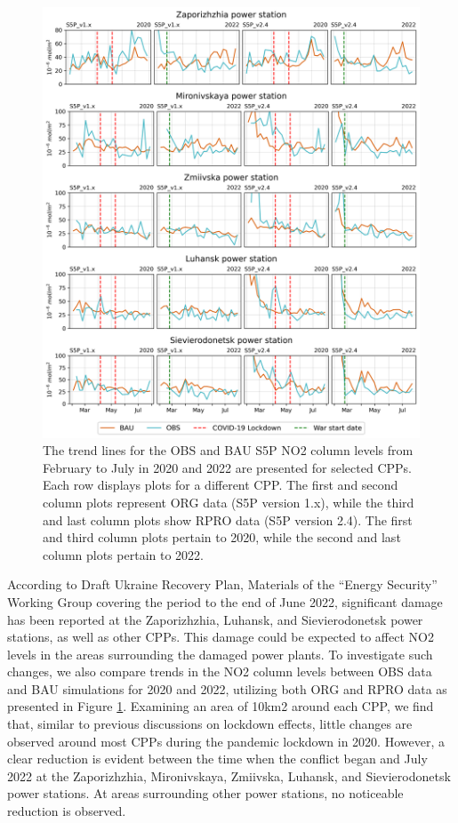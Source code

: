 \begin{figure}[p]
    \centering
    \includegraphics[width=\textwidth]{figs/chap3/fig9.png}
    \caption[OBS and BAU S5P NO2 trends (2020-2022) for selected CPPs]{The trend lines for the OBS and BAU S5P NO2 column levels from February to July in 2020 and 2022 are presented for selected CPPs. Each row displays plots for a different CPP. The first and second column plots represent ORG data (S5P version 1.x), while the third and last column plots show RPRO data (S5P version 2.4). The first and third column plots pertain to 2020, while the second and last column plots pertain to 2022.}
    \label{fig:chap3_fig9}
\end{figure}

According to Draft Ukraine Recovery Plan, Materials of the “Energy Security” Working Group covering the period to the end of June 2022, significant damage has been reported at the Zaporizhzhia, Luhansk, and Sievierodonetsk power stations, as well as other CPPs. This damage could be expected to affect NO2 levels in the areas surrounding the damaged power plants. To investigate such changes, we also compare trends in the NO2 column levels between OBS data and BAU simulations for 2020 and 2022, utilizing both ORG and RPRO data as presented in Figure \ref{fig:chap3_fig9}. Examining an area of 10km2 around each CPP, we find that, similar to previous discussions on lockdown effects, little changes are observed around most CPPs during the pandemic lockdown in 2020. However, a clear reduction is evident between the time when the conflict began and July 2022 at the Zaporizhzhia, Mironivskaya, Zmiivska, Luhansk, and Sievierodonetsk power stations. At areas surrounding other power stations, no noticeable reduction is observed.\par

